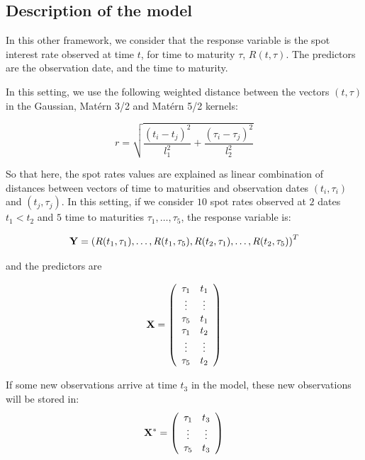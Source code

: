 \subsection{Description of the model}

In this other framework, we consider that the response variable is the spot interest rate observed at time $t$, for time to maturity $\tau$, $R(t, \tau)$. The predictors are the observation date, and the time to maturity. 

\medskip

In this setting, we use the following weighted distance between the vectors $(t, \tau)$ in the Gaussian, Mat\'ern 3/2 and Mat\'ern 5/2 kernels:

$$
r = \sqrt{\frac{(t_i - t_j)^2}{l_1^2} + \frac{(\tau_i - \tau_j)^2}{l_2^2}}
$$

So that here, the spot rates values are explained as linear combination of distances between vectors of  time to maturities and observation dates $(t_i, \tau_i)$ and $(t_j, \tau_j)$. In this setting, if we consider $10$ spot rates observed at $2$ dates $t_1 < t_2$ and $5$ time to maturities $\tau_1, \ldots, \tau_5$, the response variable is:

$$
{\bf Y} = \left(R(t_1, \tau_1), \ldots, R(t_1, \tau_5), R(t_2, \tau_1), \ldots, R(t_2, \tau_5)\right)^T
$$

and the predictors are 

$$
{\bf X} = \left( {\begin{array}{cc} \tau_1 &  t_1\\
                          \vdots & \vdots\\
                          \tau_5 &  t_1\\
                          \tau_1 &  t_2\\
                          \vdots & \vdots\\
                          \tau_5 &  t_2\\
       \end{array} } \right)
$$

If some new observations arrive at time $t_3$ in the model, these new observations will be stored in: 
$$
{\bf X}^* = \left( {\begin{array}{cc} \tau_1 &  t_3\\
                          \vdots & \vdots\\
                          \tau_5 &  t_3\\
       \end{array} } \right)
$$

